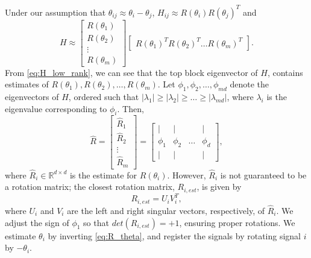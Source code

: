 \documentclass{pnastwo}
\begin{document}
\begin{article}
\begin{materials}
Under our assumption that $\theta_{ij} \approx \theta_i - \theta_j$, $H_{ij} \approx R(\theta_i) R(\theta_j)^T$
 and 
\begin{equation} \label{eq:H_low_rank}
	H \approx 
	\begin{bmatrix}
	R(\theta_1) \\
	R(\theta_2) \\
	\vdots \\
	R(\theta_m)
	\end{bmatrix}
	\begin{bmatrix}
	R(\theta_1)^T R(\theta_2)^T \dots R(\theta_m)^T
	\end{bmatrix}.
\end{equation}
%
From \eqref{eq:H_low_rank}, we can see that the top block eigenvector of $H$, %
contains estimates of $R(\theta_1), R(\theta_2), \dots, R(\theta_m)$.
%
Let $\phi_1, \phi_2, \dots, \phi_{md}$ denote the eigenvectors of $H$, ordered such that $|\lambda_1| \ge |\lambda_2| \ge \dots \ge |\lambda_{md}|$, where $\lambda_i$ is the eigenvalue corresponding to $\phi_i$. 
%
Then,
\begin{equation}
\hat{R} = 
\begin{bmatrix}
\hat{R}_1 \\
\hat{R}_2 \\
\vdots \\
\hat{R}_m
\end{bmatrix} =
\begin{bmatrix}
| & | & & | \\
\phi_1 & \phi_2 & \dots & \phi_d \\
| & | & & | 
\end{bmatrix},
\end{equation}
where $\hat{R}_i \in \mathbb{R}^{d \times d}$ is the estimate for $R(\theta_i)$. 
%
However, $\hat{R}_i$ is not guaranteed to be a rotation matrix; the closest rotation matrix, $R_{i, est}$, is given by
\begin{equation} \label{eq:R_est}
R_{i, est} = U_i V_i^T, 
\end{equation} 
where $U_i$ and $V_i$ are the left and right singular vectors, respectively, of $\hat{R}_i$.
%
We adjust the sign of $\phi_1$ so that $det(R_{i, est}) = +1$, ensuring proper rotations.
%
We estimate $\theta_{i}$ by inverting \eqref{eq:R_theta}, and register the signals by rotating signal $i$ by $-\theta_i$. 


\end{materials}
\end{article}
\end{document}
